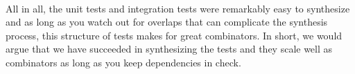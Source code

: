 \\
All in all, the unit tests and integration tests were remarkably easy to synthesize and as long as you watch out for overlaps that can complicate the synthesis process, this structure of tests makes for great combinators. In short, we would argue that we have succeeded in synthesizing the tests and they scale well as combinators as long as you keep dependencies in check.